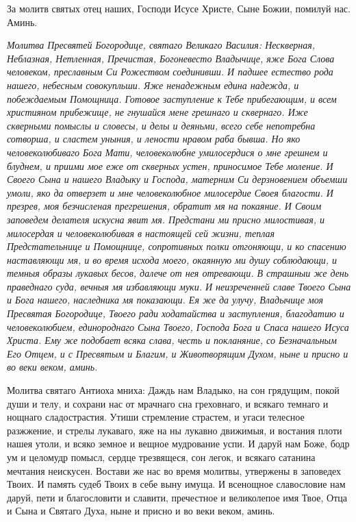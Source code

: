 За молитв святых отец наших, Господи Исусе Христе, Сыне Божии, помилуй нас. Аминь.


\itshape Молитва Пресвятей Богородице, святаго Великаго Василия:\normalfont{} Нескверная, Неблазная, Нетленная, Пречистая, Богоневесто Владычице, яже Бога Слова человеком, преславным Си Рожеством соединивши. И падшее естество рода нашего, небесным совокупльши. Яже ненадежным едина надежда, и побеждаемым Помощница. Готовое заступление к Тебе прибегающим, и всем християном прибежище, не гнушайся мене грешнаго и сквернаго. Иже скверными помыслы и словесы, и делы и деяньми, всего себе непотребна сотворша, и сластем уныния, и лености нравом раба бывша. Но яко человеколюбиваго Бога Мати, человеколюбне умилосердися о мне грешнем и блуднем, и приими  мое еже от скверных устен, приносимое Тебе моление. И Своего Сына и нашего Владыку и Господа, матерним Си дерзновением объемши умоли, яко да отверзет и мне человеколюбное милосердие Своея благости. И презрев, моя безчисленая прегрешения, обратит мя на покаяние. И Своим заповедем делателя искусна явит мя. Предстани ми присно милостивая, и милосердая и человеколюбивая в настоящей сей жизни, теплая Предстательнице и Помощнице, сопротивных полки отгоняющи, и ко спасению наставляющи мя, и во время исхода моего, окаянную ми душу соблюдающи, и темныя образы лукавых бесов, далече от нея отревающи. В страшныи же день праведнаго суда, вечныя мя избавляющи муки. И неизреченней славе Твоего Сына и Бога нашего, наследника мя показающи. Ея же да улучу, Владычице моя Пресвятая Богородице, Твоего ради ходатайства и заступления, благодатию и человеколюбием, единороднаго Сына Твоего, Господа Бога и Спаса нашего Исуса Христа. Ему же подобает всяка слава, честь и покланяние, со Безначальным Его Отцем, и с Пресвятым и Благим, и Животворящим Духом, ныне и присно и во веки веком, аминь.

Молитва святаго Антиоха мниха: Даждь нам Владыко, на сон грядущим, покой души и телу, и сохрани нас от мрачнаго сна греховнаго, и всякаго темнаго и нощнаго сладострастия. Утиши стремление страстем, и угаси телесное разжжение, и стрелы лукаваго, яже на ны лукавно движимыя, и востания плоти нашея утоли, и всяко земное и вещное мудрование успи. И даруй нам Боже, бодр ум и целомудр помысл, сердце трезвящеся, сон легок, и всякаго сатанина мечтания неискусен. Востави же нас во время молитвы, утвержены в заповедех Твоих. И память судеб Твоих в себе выну имуща. И всенощное славословие нам даруй, пети и благословити и славити, пречестное и великолепое имя Твое, Отца и Сына и Святаго Духа, ныне и присно и во веки веком, аминь.

